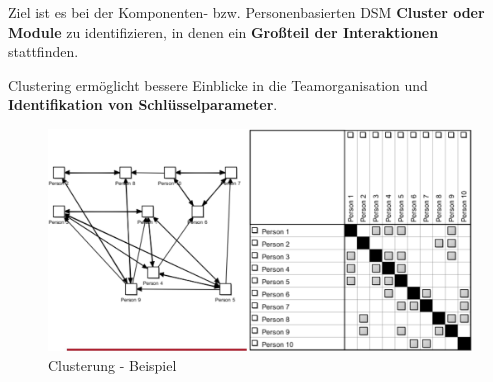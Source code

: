 Ziel ist es bei der Komponenten- bzw. Personenbasierten DSM \textbf{Cluster oder Module} zu identifizieren, in denen ein \textbf{Großteil der Interaktionen} stattfinden.

Clustering ermöglicht bessere Einblicke in die Teamorganisation und \textbf{Identifikation von Schlüsselparameter}.

\begin{figure}[H]
    \centering
    \includegraphics[width=0.8\linewidth]{Bilder/Teil3_ClusteringBeispiel.png}
    \caption{Clusterung - Beispiel}
\end{figure}

